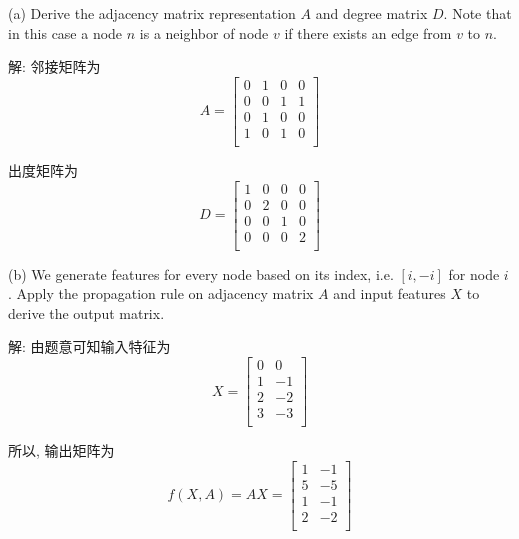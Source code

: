\documentclass{article}
\begin{document}
(a) Derive the adjacency matrix representation $A$ and degree matrix $D$. Note that in this case a node $n$ is a neighbor of node $v$ if there exists an edge from $v$ to $n$.

解: 邻接矩阵为
\begin{equation}
  A=\begin{bmatrix}
    0 & 1 & 0 & 0 \\
    0 & 0 & 1 & 1 \\
    0 & 1 & 0 & 0 \\
    1 & 0 & 1 & 0 \\
  \end{bmatrix}
\end{equation}

出度矩阵为
\begin{equation}
  D=\begin{bmatrix}
    1 & 0 & 0 & 0 \\
    0 & 2 & 0 & 0 \\
    0 & 0 & 1 & 0 \\
    0 & 0 & 0 & 2 \\
  \end{bmatrix}
\end{equation}

(b) We generate features for every node based on its index, i.e. $[i, -i]$ for node $i$.  Apply the propagation rule on adjacency matrix $A$ and input features $X$ to derive the output matrix.

解: 由题意可知输入特征为
\begin{equation}
  X=\begin{bmatrix}
    0 &  0 \\
    1 & -1 \\
    2 & -2 \\
    3 & -3 \\
  \end{bmatrix}
\end{equation}

所以, 输出矩阵为
\begin{equation}
  f(X,A)=AX
  =\begin{bmatrix}
    1 & -1 \\
    5 & -5 \\
    1 & -1 \\
    2 & -2 \\
  \end{bmatrix}
\end{equation}
\end{document}
